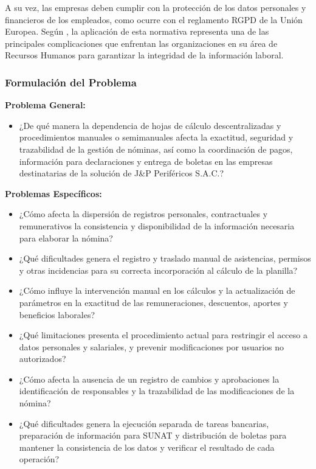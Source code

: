 A su vez, las empresas deben cumplir con la protección de los datos personales y financieros de los empleados, 
como ocurre con el reglamento RGPD de la Unión Europea. 
Según \textcite{bizneo2026problemas}, la aplicación de esta normativa representa una de las principales complicaciones que enfrentan las organizaciones en su área de Recursos Humanos 
para garantizar la integridad de la información laboral.
\subsubsection{Formulación del Problema}

\noindent\textbf{Problema General:}
\begin{itemize}[leftmargin=*, label={}]
    \item ¿De qué manera la dependencia de hojas de cálculo
    descentralizadas y procedimientos manuales o semimanuales
    afecta la exactitud, seguridad y trazabilidad de la gestión
    de nóminas, así como la coordinación de pagos, información
    para declaraciones y entrega de boletas en las empresas
    destinatarias de la solución de J\&P Periféricos S.A.C.?
\end{itemize}

\noindent\textbf{Problemas Específicos:}
\begin{itemize}[
    leftmargin=*,
    label={\rule[0.2ex]{4.5pt}{4.5pt}},
    topsep=4pt,
    itemsep=6pt
]
    \item ¿Cómo afecta la dispersión de registros personales,
    contractuales y remunerativos la consistencia y disponibilidad
    de la información necesaria para elaborar la nómina?

    \item ¿Qué dificultades genera el registro y traslado manual
    de asistencias, permisos y otras incidencias para su correcta
    incorporación al cálculo de la planilla?

    \item ¿Cómo influye la intervención manual en los cálculos
    y la actualización de parámetros en la exactitud de las
    remuneraciones, descuentos, aportes y beneficios laborales?

    \item ¿Qué limitaciones presenta el procedimiento actual
    para restringir el acceso a datos personales y salariales,
    y prevenir modificaciones por usuarios no autorizados?

    \item ¿Cómo afecta la ausencia de un registro de cambios
    y aprobaciones la identificación de responsables y la
    trazabilidad de las modificaciones de la nómina?

    \item ¿Qué dificultades genera la ejecución separada de
    tareas bancarias, preparación de información para SUNAT
    y distribución de boletas para mantener la consistencia
    de los datos y verificar el resultado de cada operación?
\end{itemize}